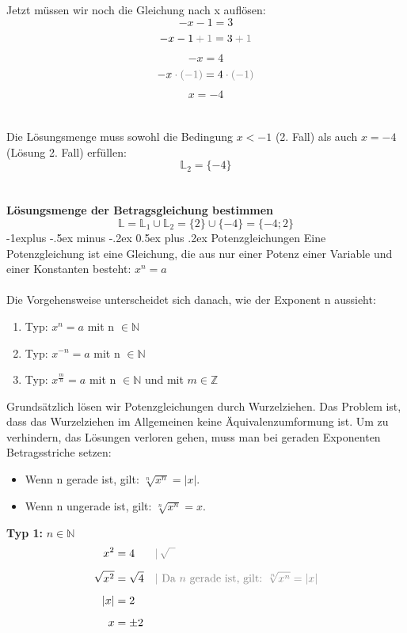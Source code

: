 \documentclass[a4paper,10pt]{article}
\makeatletter
\renewcommand{\subsection}{\@startsection{subsection}{2}{0mm}%
                                {-1explus -.5ex minus -.2ex}%
                                {0.5ex plus .2ex}%
                                {\normalfont\normalsize\bfseries}}
\makeatother
\begin{document}
\begin{multicols}{3}
    Jetzt müssen wir noch die Gleichung nach x auflösen:
    \[-x - 1 = 3\]
    \[-x - 1 {\color{gray}\:+\:1} = 3 {\color{gray}\:+\:1}\]
    \[-x = 4\]
    \[-x {\color{gray}\:\cdot\:(-1)} = 4 {\color{gray}\:\cdot\:(-1)}\]
    \[x = -4\] \\~\\
    Die Lösungsmenge muss sowohl die Bedingung $x < -1$ (2. Fall) als auch $x = -4$ (Lösung 2. Fall) erfüllen:
    \[\mathbb{L}_2 = \{-4\}\]\\~\\
    \textbf{Lösungsmenge der Betragsgleichung bestimmen}\\
    \[\mathbb{L} = \mathbb{L}_1 \cup \mathbb{L}_2 = \{2\} \cup \{-4\} = \{-4; 2\}\]
    \newpage
    \subsection{Potenzgleichungen}
    Eine Potenzgleichung ist eine Gleichung, die aus nur einer Potenz einer Variable und einer Konstanten besteht: $x^n = a$ \\~\\
    Die Vorgehensweise unterscheidet sich danach, wie der Exponent n aussieht:
    \begin{enumerate}
        \item Typ: $x^n = a$ mit n $\in \mathbb{N}$
        \item Typ: $x^{-n} = a$ mit n $\in \mathbb{N}$
        \item Typ: $x^{\frac{m}{n}} = a$ mit n $\in \mathbb{N}$ und mit $m \in \mathbb{Z}$
    \end{enumerate}
    Grundsätzlich lösen wir Potenzgleichungen durch Wurzelziehen. Das Problem ist, dass das Wurzelziehen im Allgemeinen keine Äquivalenzumformung ist. Um zu verhindern, das Lösungen verloren gehen, muss man bei geraden Exponenten Betragsstriche setzen:
    \begin{itemize}
        \item Wenn n gerade ist, gilt: $\sqrt[n]{x^n} = |x|$.
        \item Wenn n ungerade ist, gilt: $\sqrt[n]{x^n} = x$.
    \end{itemize}
    \textbf{Typ 1:} $n \in \mathbb{N}$
    \begin{align*} x^2 &= 4 &&{\color{gray}|\, \sqrt{\phantom{x}}} \\[5px] \sqrt{x^2} &= \sqrt{4} &&{\color{gray}| \text{ Da $n$ gerade ist, gilt: } \sqrt[n]{x^n} = |x|} \\[5px] |x| &= 2 \\[5px] x &= \pm 2 \end{align*}

\end{multicols}
\end{document}

